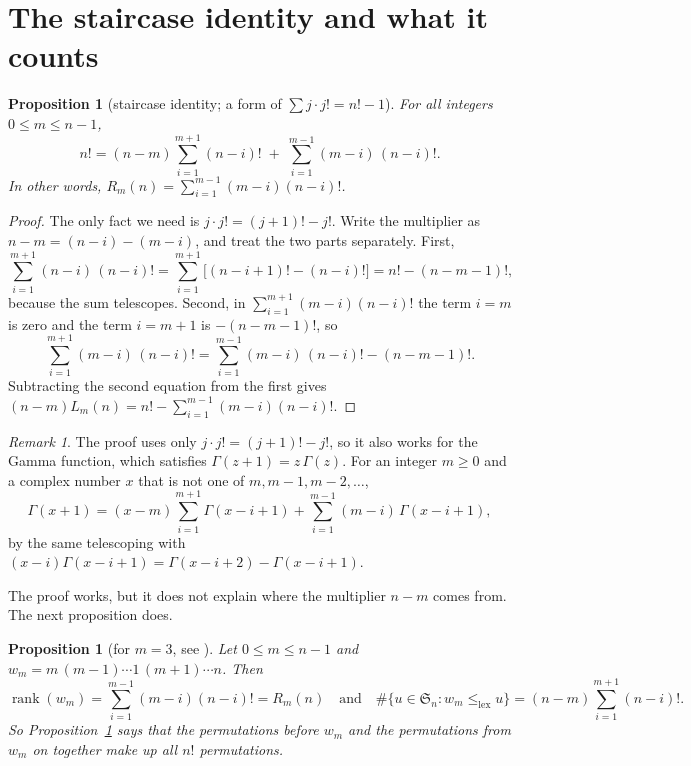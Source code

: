 \documentclass[11pt]{amsart}
\theoremstyle{plain}
\newtheorem{proposition}[theorem]{Proposition}
\theoremstyle{definition}
\theoremstyle{remark}
\newtheorem{remark}[theorem]{Remark}
\newcommand{\Sym}{\mathfrak{S}}
\newcommand{\lexeq}{\le_{\mathrm{lex}}}
\newcommand{\rank}{\operatorname{rank}}
\begin{document}
\section{The staircase identity and what it counts}\label{sec:identity}

\begin{proposition}[staircase identity; a form of $\sum j\cdot j!=n!-1$]\label{thm:identity}
For all integers $0\le m\le n-1$,
\[
  n!=(n-m)\sum_{i=1}^{m+1}(n-i)!\;+\;\sum_{i=1}^{m-1}(m-i)\,(n-i)!.
\]
In other words, $R_m(n)=\sum_{i=1}^{m-1}(m-i)(n-i)!$.
\end{proposition}

\begin{proof}
The only fact we need is $j\cdot j!=(j+1)!-j!$. Write the multiplier as
$n-m=(n-i)-(m-i)$, and treat the two parts separately. First,
\[
  \sum_{i=1}^{m+1}(n-i)\,(n-i)!=\sum_{i=1}^{m+1}\bigl[(n-i+1)!-(n-i)!\bigr]
  =n!-(n-m-1)!,
\]
because the sum telescopes. Second, in $\sum_{i=1}^{m+1}(m-i)(n-i)!$ the term
$i=m$ is zero and the term $i=m+1$ is $-(n-m-1)!$, so
\[
  \sum_{i=1}^{m+1}(m-i)\,(n-i)!=\sum_{i=1}^{m-1}(m-i)\,(n-i)!-(n-m-1)!.
\]
Subtracting the second equation from the first gives
$(n-m)L_m(n)=n!-\sum_{i=1}^{m-1}(m-i)(n-i)!$.
\end{proof}

\begin{remark}\label{prop:gamma}
The proof uses only $j\cdot j!=(j+1)!-j!$, so it also works for the Gamma
function, which satisfies $\Gamma(z+1)=z\,\Gamma(z)$. For an integer $m\ge0$
and a complex number $x$ that is not one of $m,m-1,m-2,\dots$,
\[
  \Gamma(x+1)=(x-m)\sum_{i=1}^{m+1}\Gamma(x-i+1)+\sum_{i=1}^{m-1}(m-i)\,\Gamma(x-i+1),
\]
by the same telescoping with $(x-i)\Gamma(x-i+1)=\Gamma(x-i+2)-\Gamma(x-i+1)$.
\end{remark}

The proof works, but it does not explain where the multiplier $n-m$ comes
from. The next proposition does.

\begin{proposition}[for $m=3$, see \cite{A052649}]\label{thm:lex}
Let $0\le m\le n-1$ and $w_m=m\,(m-1)\cdots1\,(m+1)\cdots n$. Then
\[
  \rank(w_m)=\sum_{i=1}^{m-1}(m-i)(n-i)!=R_m(n)
  \quad\text{and}\quad
  \#\{u\in\Sym_n: w_m\lexeq u\}=(n-m)\sum_{i=1}^{m+1}(n-i)!.
\]
So Proposition~\ref{thm:identity} says that the permutations before $w_m$ and the
permutations from $w_m$ on together make up all $n!$ permutations.
\end{proposition}
\end{document}
